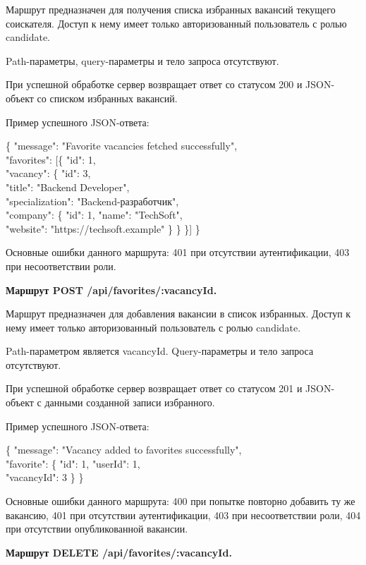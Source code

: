 Маршрут предназначен для получения списка избранных вакансий текущего соискателя. Доступ к нему имеет только авторизованный пользователь с ролью candidate.

Path-параметры, query-параметры и тело запроса отсутствуют.

При успешной обработке сервер возвращает ответ со статусом 200 и JSON-объект со списком избранных вакансий.

Пример успешного JSON-ответа:

\begin{flushleft}
	\small\ttfamily
	\{ "message": "Favorite vacancies fetched successfully",\\
	"favorites": [\{ "id": 1,\\
	"vacancy": \{ "id": 3,\\
	"title": "Backend Developer",\\
	"specialization": "Backend-разработчик",\\
	"company": \{ "id": 1, "name": "TechSoft",\\
	"website": "https://techsoft.example" \} \} \}] \}
\end{flushleft}

Основные ошибки данного маршрута: 401 при отсутствии аутентификации, 403 при несоответствии роли.

\textbf{Маршрут POST /api/favorites/:vacancyId.}

Маршрут предназначен для добавления вакансии в список избранных. Доступ к нему имеет только авторизованный пользователь с ролью candidate.

Path-параметром является vacancyId. Query-параметры и тело запроса отсутствуют.

При успешной обработке сервер возвращает ответ со статусом 201 и JSON-объект с данными созданной записи избранного.

Пример успешного JSON-ответа:

\begin{flushleft}
	\small\ttfamily
	\{ "message": "Vacancy added to favorites successfully",\\
	"favorite": \{ "id": 1, "userId": 1,\\
	"vacancyId": 3 \} \}
\end{flushleft}

Основные ошибки данного маршрута: 400 при попытке повторно добавить ту же вакансию, 401 при отсутствии аутентификации, 403 при несоответствии роли, 404 при отсутствии опубликованной вакансии.

\textbf{Маршрут DELETE /api/favorites/:vacancyId.}

